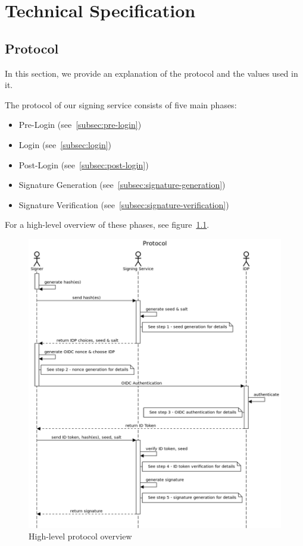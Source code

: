 \chapter{Technical Specification}
\section{Protocol}

In this section, we provide an explanation of the protocol and the values used in it.

The protocol of our signing service consists of five main phases:

\begin{itemize}
    \item Pre-Login (see~\ref{subsec:pre-login})
    \item Login (see~\ref{subsec:login})
    \item Post-Login (see~\ref{subsec:post-login})
    \item Signature Generation (see~\ref{subsec:signature-generation})
    \item Signature Verification (see~\ref{subsec:signature-verification})
\end{itemize}

For a high-level overview of these phases, see figure~\ref{fig:highlevelprotocoloverview}.

\begin{figure}
    \begin{center}
        \includegraphics[scale=0.5]{images/protocol_signature_generation_high_level.png}
        \caption{High-level protocol overview}
        \label{fig:highlevelprotocoloverview}
    \end{center}
\end{figure}

